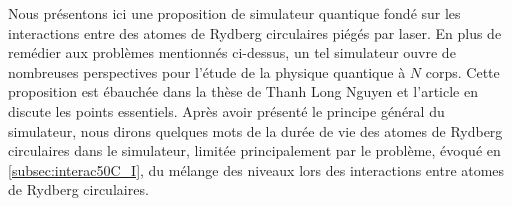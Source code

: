 Nous présentons ici une proposition de simulateur quantique fondé sur les interactions entre des atomes de Rydberg circulaires piégés par laser.
En plus de remédier aux problèmes mentionnés ci-dessus, un tel simulateur ouvre de nombreuses perspectives pour l'étude de la physique quantique à $N$ corps.
Cette proposition est ébauchée dans la thèse de Thanh Long Nguyen \cite{PHD_NGUYEN} et l'article \cite{ENS_PRE_CIRCSIM} en discute les points essentiels.
Après avoir présenté le principe général du simulateur, nous dirons quelques mots de la durée de vie des atomes de Rydberg circulaires dans le simulateur, limitée principalement par le problème, évoqué en \ref{subsec:interac50C_I}, du mélange des niveaux lors des interactions entre atomes de Rydberg circulaires.

